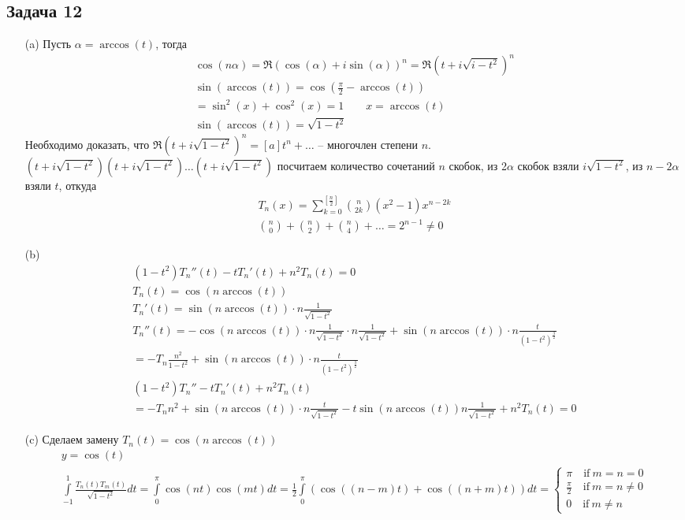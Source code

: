 \subsection*{Задача 12}
\begin{enumerate}
\item[(a)]
	Пусть $\alpha = \arccos(t)$, тогда
	\begin{gather*}
		\cos(n \alpha) = \Re(\cos(\alpha) + i \sin(\alpha))^n = \Re(t + i \sqrt{i - t^2})^n\\
		\sin(\arccos(t)) = \cos(\frac{\pi}{2} - \arccos(t))\\
		= \sin^2(x) + \cos^2(x) = 1\qquad x = \arccos(t)\\
		\sin(\arccos(t)) = \sqrt{1 - t^2}
	\end{gather*}
	Необходимо доказать, что $\Re(t + i \sqrt{1 - t^2})^n = [a]t^n + \ldots$ -- многочлен степени $n$.\\
	$(t + i\sqrt{1 - t^2})(t + i\sqrt{1 - t^2}) \ldots (t + i\sqrt{1 - t^2})$ посчитаем количество сочетаний $n$ скобок, из 2$\alpha$ скобок взяли $i \sqrt{1-t^2}$, из $n - 2\alpha$ взяли $t$, откуда
	\begin{gather*}
		T_n(x) = \sum\limits_{k = 0}^{\left[\frac{n}{2}\right]} {{n}\choose{2k}} (x^2 - 1)x^{n-2k}\\
		{{n}\choose{0}} + {{n}\choose{2}} + {{n}\choose{4}} + \ldots = 2^{n-1} \ne 0
	\end{gather*}

\item[(b)]
	\begin{gather*}
		(1-t^2)T_n''(t) - t T_n'(t) + n^2T_n(t) = 0\\
		T_n(t) = \cos(n \arccos(t))\\
		T_n'(t) = \sin(n \arccos(t)) \cdot n \frac{1}{\sqrt{1 - t^2}}\\
		T_n''(t) = -\cos(n \arccos(t)) \cdot n \frac{1}{\sqrt{1 - t^2}} \cdot n \frac{1}{\sqrt{1 - t^2}} + \sin(n \arccos(t)) \cdot n \frac{t}{(1 - t^2)^{\frac{3}{2}}}\\
		= -T_n \frac{n^2}{1 - t^2} + \sin(n \arccos(t)) \cdot n \frac{t}{(1 - t^2)^{\frac{3}{2}}}\\
		(1 - t^2) T_n'' - tT_n'(t) + n^2 T_n(t)\\
		= -T_n n^2 + \sin(n \arccos(t)) \cdot n \frac{t}{\sqrt{1 - t^2}} - t \sin(n \arccos(t)) n \frac{1}{\sqrt{1 - t^2}} + n^2 T_n(t) = 0
	\end{gather*}

\item[(c)]
	Сделаем замену $T_n(t) = \cos(n \arccos(t))$
	\begin{gather*}
		y = \cos(t)\\
		\int\limits_{-1}^{1} \frac{T_n(t) T_m(t)}{\sqrt{1 - t^2}} dt
		= \int\limits_{0}^{\pi}\cos(nt)\cos(mt) dt
		= \frac{1}{2} \int\limits_{0}^{\pi} (\cos((n - m)t) + \cos((n + m)t))dt
		=
		\begin{cases}
			\pi\quad \text{if}\ m = n = 0\\
			\frac{\pi}{2}\quad \text{if}\ m = n \ne 0\\
			0\quad \text{if}\ m \ne n 
		\end{cases}
	\end{gather*}


\end{enumerate}
